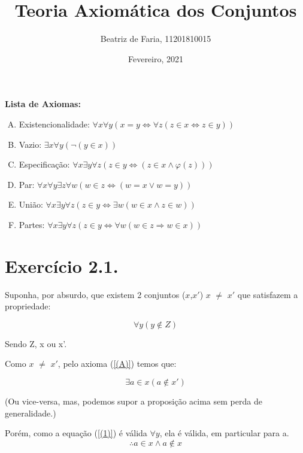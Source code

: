 \documentclass[12pt]{extarticle}
\title{Teoria Axiomática dos Conjuntos}
\author{Beatriz de Faria, 11201810015}
\date{Fevereiro, 2021}
\begin{document}
\maketitle

{\Large\textbf{Lista de Axiomas:}}

\begin{enumerate}[(A)]
    \item  \label{(A)} Existencionalidade: $\forall x \forall y (x = y \Leftrightarrow \forall z (z \in x \Leftrightarrow z \in y))$
    \item \label{(B)} Vazio: $\exists x \forall y (\neg(y \in x))$
    \item \label{(C)} Especificação: $\forall x \exists y \forall z (z \in  y \Leftrightarrow (z \in x \land \varphi(z)))$
    \item \label{(D)} Par: $\forall x \forall y \exists z \forall w (w \in z \Leftrightarrow (w = x \lor w = y))$
    \item \label{(E)} União: $\forall x \exists y \forall z (z \in y \Leftrightarrow \exists w (w \in x \land z \in w))$
    \item \label{(F)} Partes: $\forall x \exists y \forall z (z \in y \Leftrightarrow \forall w (w \in z \Rightarrow w \in x))$
\end{enumerate}

\section{Exercício 2.1.}

Suponha, por absurdo, que existem 2 conjuntos ($x$,$x'$) $x$ $\neq$ $x'$ que satisfazem a propriedade:

\begin{equation}
   \forall y (y \notin Z)
\end{equation}\label{(1)}

Sendo Z, x ou x'.

Como $x$ $\neq$ $x'$, pelo axioma (\ref{(A)}) temos que:

$$\exists a \in x (a \notin x')$$

(Ou vice-versa, mas, podemos supor a proposição acima sem perda de generalidade.)

Porém, como a equação (\ref{(1)}) é válida $\forall y$, ela é válida, em particular para a.
$$\therefore a \in x \land a \notin x$$
\end{document}
